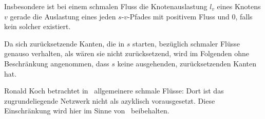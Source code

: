Insbesondere ist bei einem schmalen Fluss die Knotenauslastung $l_v$ eines Knotens $v$ gerade die Auslastung eines jeden $s$-$v$-Pfades mit positivem Fluss und $0$, falls kein solcher existiert.

Da sich zurücksetzende Kanten, die in $s$ starten, bezüglich schmaler Flüsse genauso verhalten, als wären sie nicht zurücksetzend, wird im Folgenden ohne Beschränkung angenommen, dass $s$ keine ausgehenden, zurücksetzenden Kanten hat.

\begin{remark}
	Ronald Koch betrachtet in~\cite{Koch2012} allgemeinere schmale Flüsse: Dort ist das zugrundeliegende Netzwerk nicht als azyklisch vorausgesetzt.
	Diese Einschränkung wird hier im Sinne von~\cite{Cominetti2015} beibehalten.
\end{remark}

